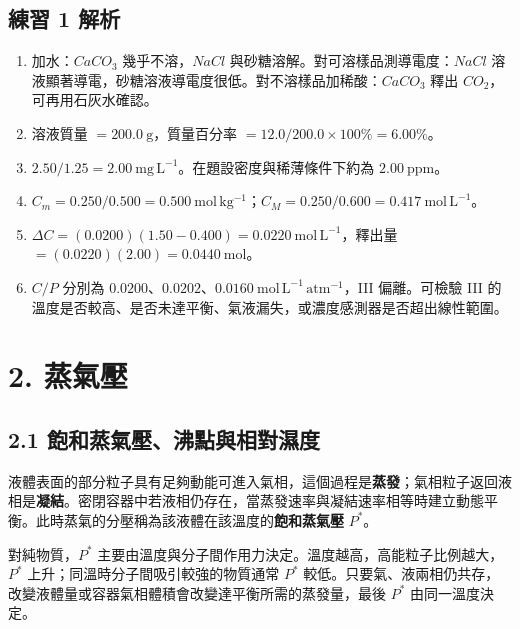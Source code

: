 \documentclass[11pt,a4paper]{article}
\providecommand{\tightlist}{%
  \setlength{\itemsep}{0pt}\setlength{\parskip}{0pt}}
\begin{document}
\subsection{練習 1 解析}\label{ux7df4ux7fd2-1-ux89e3ux6790}

\begin{enumerate}
\def\labelenumi{\arabic{enumi}.}
\tightlist
\item
  加水：\(CaCO_3\) 幾乎不溶，\(NaCl\) 與砂糖溶解。對可溶樣品測導電度：\(NaCl\) 溶液顯著導電，砂糖溶液導電度很低。對不溶樣品加稀酸：\(CaCO_3\) 釋出 \(CO_2\)，可再用石灰水確認。
\item
  溶液質量 \(=200.0\ \mathrm g\)，質量百分率 \(=12.0/200.0\times100\%=6.00\%\)。
\item
  \(2.50/1.25=2.00\ \mathrm{mg\,L^{-1}}\)。在題設密度與稀薄條件下約為 \(2.00\ \mathrm{ppm}\)。
\item
  \(C_m=0.250/0.500=0.500\ \mathrm{mol\,kg^{-1}}\)；\(C_M=0.250/0.600=0.417\ \mathrm{mol\,L^{-1}}\)。
\item
  \(\Delta C=(0.0200)(1.50-0.400)=0.0220\ \mathrm{mol\,L^{-1}}\)，釋出量 \(=(0.0220)(2.00)=0.0440\ \mathrm{mol}\)。
\item
  \(C/P\) 分別為 \(0.0200\)、\(0.0202\)、\(0.0160\ \mathrm{mol\,L^{-1}\,atm^{-1}}\)，III 偏離。可檢驗 III 的溫度是否較高、是否未達平衡、氣液漏失，或濃度感測器是否超出線性範圍。
\end{enumerate}

\section{2. 蒸氣壓}\label{ux84b8ux6c23ux58d3}

\subsection{2.1 飽和蒸氣壓、沸點與相對濕度}\label{ux98fdux548cux84b8ux6c23ux58d3ux6cb8ux9edeux8207ux76f8ux5c0dux6fd5ux5ea6}

液體表面的部分粒子具有足夠動能可進入氣相，這個過程是\textbf{蒸發}；氣相粒子返回液相是\textbf{凝結}。密閉容器中若液相仍存在，當蒸發速率與凝結速率相等時建立動態平衡。此時蒸氣的分壓稱為該液體在該溫度的\textbf{飽和蒸氣壓} \(P^*\)。

對純物質，\(P^*\) 主要由溫度與分子間作用力決定。溫度越高，高能粒子比例越大，\(P^*\) 上升；同溫時分子間吸引較強的物質通常 \(P^*\) 較低。只要氣、液兩相仍共存，改變液體量或容器氣相體積會改變達平衡所需的蒸發量，最後 \(P^*\) 由同一溫度決定。
\end{document}
